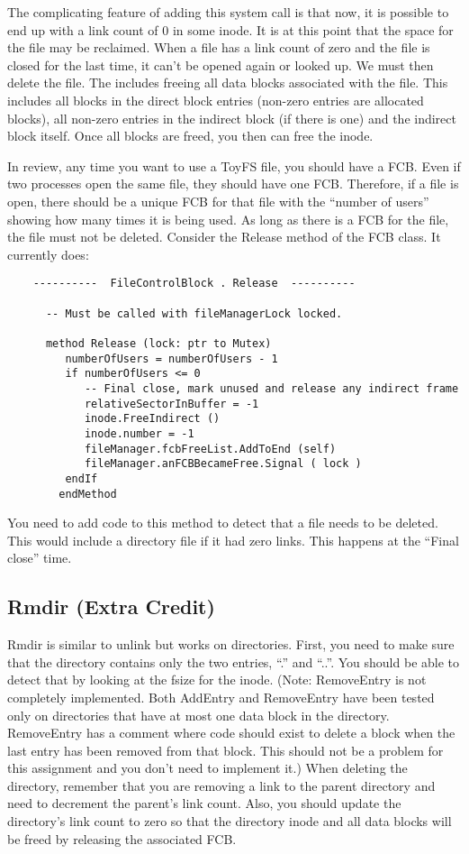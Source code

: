 \documentclass[11pt]{article}
\begin{document}
The complicating feature of adding this system call is that now, it is
possible to end up with a link count of 0 in some inode.  It is at
this point that the space for the file may be reclaimed.  When a file
has a link count of zero and the file is closed for the last time, it
can't be opened again or looked up.  We must then delete the file.
The includes freeing all data blocks associated with the file.  This
includes all blocks in the direct block entries (non-zero entries are
allocated blocks), all non-zero entries in the indirect block (if
there is one) and the indirect block itself.  Once all blocks are
freed, you then can free the inode.

In review, any time you want to use a ToyFS file, you should have a
FCB.  Even if two processes open the same file, they should have one
FCB.  Therefore, if a file is open, there should be a unique FCB for
that file with the “number of users” showing how many times it is
being used.  As long as there is a FCB for the file, the file must not
be deleted.  Consider the Release method of the FCB class.  It
currently does:

\begin{verbatim}
    ----------  FileControlBlock . Release  ----------

      -- Must be called with fileManagerLock locked.

      method Release (lock: ptr to Mutex)
         numberOfUsers = numberOfUsers - 1
         if numberOfUsers <= 0
            -- Final close, mark unused and release any indirect frame
            relativeSectorInBuffer = -1
            inode.FreeIndirect ()
            inode.number = -1
            fileManager.fcbFreeList.AddToEnd (self)
            fileManager.anFCBBecameFree.Signal ( lock )
         endIf
        endMethod
\end{verbatim}

You need to add code to this method to detect that a file needs to be
deleted.  This would include a directory file if it had zero links.
This happens at the ``Final close'' time.

\subsection{Rmdir (Extra Credit)}

Rmdir is similar to unlink but works on directories.  First, you need
to make sure that the directory contains only the two entries, ``.''
and ``..''.  You should be able to detect that by looking at the fsize
for the inode.  (Note: RemoveEntry is not completely implemented.
Both AddEntry and RemoveEntry have been tested only on directories
that have at most one data block in the directory.  RemoveEntry has a
comment where code should exist to delete a block when the last entry
has been removed from that block.  This should not be a problem for
this assignment and you don't need to implement it.)  When deleting
the directory, remember that you are removing a link to the parent
directory and need to decrement the parent's link count.  Also, you
should update the directory's link count to zero so that the
directory inode and all data blocks will be freed by releasing the
associated FCB.
\end{document}

